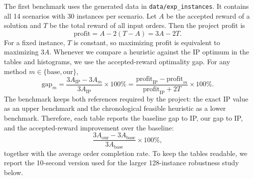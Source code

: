 \documentclass[10pt,a4paper]{article}
\begin{document}
The first benchmark uses the generated data in \texttt{data/exp\_instances}.
It contains all 14 scenarios with 30 instances per scenario.  Let $A$ be the
accepted reward of a solution and $T$ be the total reward of all input orders.
Then the project profit is
\[
\text{profit}=A-2(T-A)=3A-2T.
\]
For a fixed instance, $T$ is constant, so maximizing profit is equivalent to
maximizing $3A$.  Whenever we compare a heuristic against the IP optimum in the
tables and histograms, we use the accepted-reward optimality gap.  For any method
$m\in\{\mathrm{base},\mathrm{our}\}$,
\[
\text{gap}_m
=\frac{3A_{\mathrm{IP}}-3A_m}{3A_{\mathrm{IP}}}\times 100\%
=\frac{\text{profit}_{\mathrm{IP}}-\text{profit}_{m}}
{\text{profit}_{\mathrm{IP}}+2T}\times 100\%.
\]
The benchmark keeps both references required by the project: the exact IP value
as an upper benchmark and the chronological feasible heuristic as a lower
benchmark.  Therefore, each table reports the baseline gap to IP, our gap to IP,
and the accepted-reward improvement over the baseline:
\[
\frac{3A_{\mathrm{our}}-3A_{\mathrm{base}}}{3A_{\mathrm{base}}}\times 100\%,
\]
together with the average order completion rate.  To keep the tables readable,
we report the 10-second version used for the larger 128-instance robustness
study below.
\end{document}
